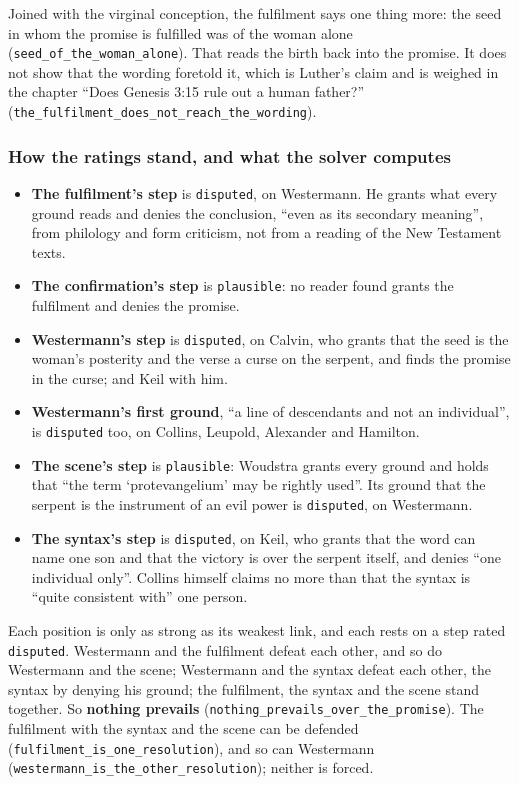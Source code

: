 \documentclass[11pt]{article}
\begin{document}
Joined with the virginal conception, the fulfilment says one thing more: the seed in whom the promise is fulfilled was of the woman alone (\texttt{seed\_\allowbreak{}of\_\allowbreak{}the\_\allowbreak{}woman\_\allowbreak{}alone}). That reads the birth back into the promise. It does not show that the wording foretold it, which is Luther’s claim and is weighed in the chapter “Does Genesis 3:15 rule out a human father?” (\texttt{the\_\allowbreak{}fulfilment\_\allowbreak{}does\_\allowbreak{}not\_\allowbreak{}reach\_\allowbreak{}the\_\allowbreak{}wording}).

\subsubsection*{How the ratings stand, and what the solver computes}
\begin{itemize}
  \item \textbf{The fulfilment’s step} is \texttt{disputed}, on Westermann. He grants what every ground reads and denies the conclusion, “even as its secondary meaning”, from philology and form criticism, not from a reading of the New Testament texts.
  \item \textbf{The confirmation’s step} is \texttt{plausible}: no reader found grants the fulfilment and denies the promise.
  \item \textbf{Westermann’s step} is \texttt{disputed}, on Calvin, who grants that the seed is the woman’s posterity and the verse a curse on the serpent, and finds the promise in the curse; and Keil with him.
  \item \textbf{Westermann’s first ground}, “a line of descendants and not an individual”, is \texttt{disputed} too, on Collins, Leupold, Alexander and Hamilton.
  \item \textbf{The scene’s step} is \texttt{plausible}: Woudstra grants every ground and holds that “the term ‘protevangelium’ may be rightly used”. Its ground that the serpent is the instrument of an evil power is \texttt{disputed}, on Westermann.
  \item \textbf{The syntax’s step} is \texttt{disputed}, on Keil, who grants that the word can name one son and that the victory is over the serpent itself, and denies “one individual only”. Collins himself claims no more than that the syntax is “quite consistent with” one person.
\end{itemize}
Each position is only as strong as its weakest link, and each rests on a step rated \texttt{disputed}. Westermann and the fulfilment defeat each other, and so do Westermann and the scene; Westermann and the syntax defeat each other, the syntax by denying his ground; the fulfilment, the syntax and the scene stand together. So \textbf{nothing prevails} (\texttt{nothing\_\allowbreak{}prevails\_\allowbreak{}over\_\allowbreak{}the\_\allowbreak{}promise}). The fulfilment with the syntax and the scene can be defended (\texttt{fulfilment\_\allowbreak{}is\_\allowbreak{}one\_\allowbreak{}resolution}), and so can Westermann (\texttt{westermann\_\allowbreak{}is\_\allowbreak{}the\_\allowbreak{}other\_\allowbreak{}resolution}); neither is forced.
\end{document}
